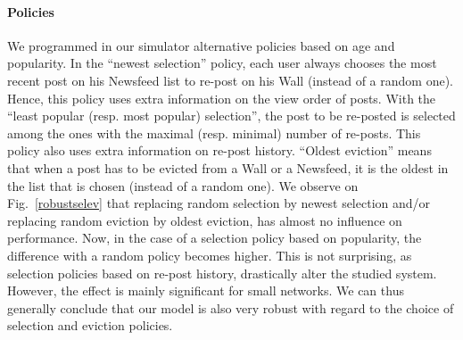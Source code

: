 \documentclass[10pt, conference, letterpaper]{IEEEtran}
\begin{document}
{	
\paragraph{Policies}
We programmed in our simulator alternative policies based on age and popularity. In the ``newest selection'' policy, each user always chooses the most recent post on his Newsfeed list to re-post on his Wall (instead of a random one). Hence, this policy uses extra information on the view order of posts. With the ``least popular (resp. most popular) selection'', the post to be re-posted is selected among the ones with the maximal (resp. minimal) number of re-posts. This policy also uses extra information on re-post history. ``Oldest eviction'' means that when a post has to be evicted from a Wall or a Newsfeed, it is the oldest in the list that is chosen (instead of a random one). We observe on Fig.~\ref{robustselev} that replacing random selection by newest selection and/or replacing random eviction by oldest eviction, has almost no influence on performance. Now, in the case of a selection policy based on popularity, the difference with a random policy becomes higher. This is not surprising, as selection policies based on re-post history, drastically alter the studied system. However, the effect is mainly significant for small networks. We can thus generally conclude that our model is also very robust with regard to the choice of selection and eviction policies.

		

}
\end{document}
